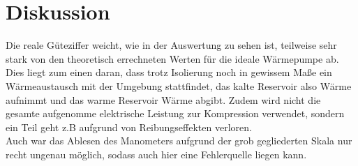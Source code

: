 \section{Diskussion}
\label{sec:Diskussion}
Die reale Güteziffer weicht, wie in der Auswertung zu sehen ist, teilweise sehr stark von den
theoretisch errechneten Werten für die ideale Wärmepumpe ab. Dies liegt zum einen
daran, dass trotz Isolierung noch in gewissem Maße ein Wärmeaustausch mit der Umgebung
stattfindet, das kalte Reservoir also Wärme aufnimmt und das warme Reservoir Wärme abgibt.
Zudem wird nicht die gesamte aufgenomme elektrische Leistung zur Kompression
verwendet, sondern ein Teil geht z.B aufgrund von Reibungseffekten verloren.
\\
Auch war das Ablesen des Manometers aufgrund der grob gegliederten Skala nur recht ungenau möglich,
sodass auch hier eine Fehlerquelle liegen kann.
